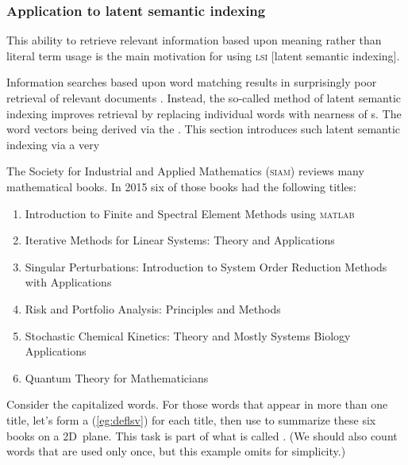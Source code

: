 




\begin{reduce}
\subsubsection{Application to latent semantic indexing}
\label{sec:alsi}

\begin{quoted}{\cite{Berry95}}%
This ability to retrieve relevant information based upon meaning rather than literal term usage is the main motivation for using \textsc{lsi} [latent semantic indexing].
\end{quoted}

Information searches based upon word matching results in surprisingly poor retrieval of relevant documents \cite[\S5.5]{Berry95}.
Instead, the so-called method of latent semantic indexing improves 
retrieval by replacing individual words with nearness of s. 
The word vectors being derived via the .
This section introduces such latent semantic indexing via a very 


The Society for Industrial and Applied Mathematics (\textsc{siam}) reviews many mathematical books.
In 2015 six of those books had the following titles:
\begin{enumerate}
\item Introduction to Finite and Spectral Element Methods using \textsc{matlab}
\item Iterative Methods for Linear Systems: Theory and Applications 
\item Singular Perturbations: Introduction to System Order Reduction Methods with Applications 
\item Risk and Portfolio Analysis: Principles and Methods 
\item Stochastic Chemical Kinetics: Theory and Mostly Systems Biology Applications
\item Quantum Theory for Mathematicians 
\end{enumerate}
Consider the capitalized words. 
For those words that appear in more than one title, let's form a  (\cref{eg:deflsv}) for each title, then use  to summarize these six books on a 2D~plane.
This task is part of what is called  \cite[]{Berry95}.  
(We should also count words that are used only once, but this example omits for simplicity.)


\end{reduce}
